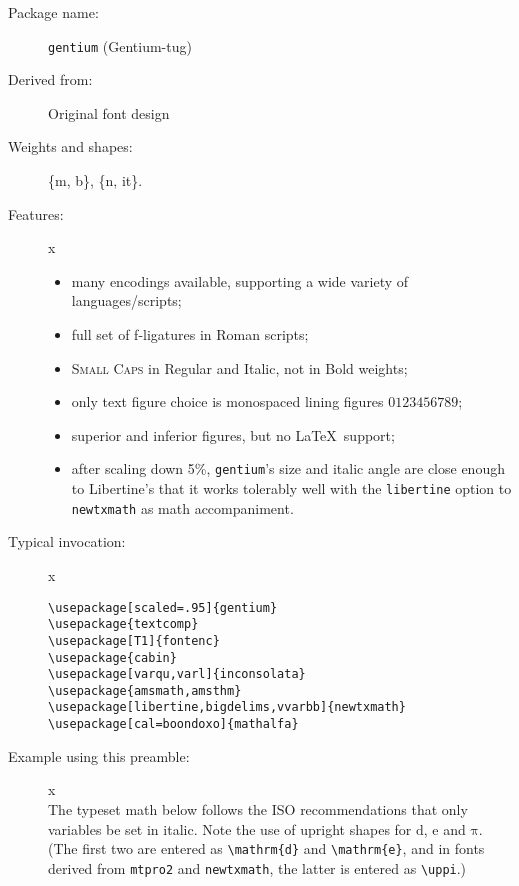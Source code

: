 \documentclass{article}
\def\Pr{\ensuremath{\mathbb{P}}}
\def\d{\mathrm{d}}
\begin{document}
\thispagestyle{empty}
\begin{description}
\item[Package name:] {\tt gentium} (Gentium-tug)
\item[Derived from:] Original font design
\item[Weights and shapes:]  \{m, b\}, \{n, it\}. 
\item[Features:]{\color{white}x}\\[-15pt]  
\begin{itemize}
\item many encodings available, supporting a wide variety of languages/scripts;
\item
full set of f-ligatures in Roman scripts;
\item \textsc{Small Caps} in Regular and Italic, not in Bold weights;
\item only text figure choice is monospaced lining figures $0123456789$;
\item superior and inferior figures, but no \LaTeX\ support; 
\item after scaling down 5\%, {\tt gentium}'s size and italic angle are close enough to Libertine's that it works tolerably well with the {\tt libertine} option to {\tt newtxmath} as math accompaniment.
\end{itemize}
\item[Typical invocation:]{\color{white}x}
\begin{verbatim}
\usepackage[scaled=.95]{gentium} 
\usepackage{textcomp}
\usepackage[T1]{fontenc}
\usepackage{cabin}
\usepackage[varqu,varl]{inconsolata}
\usepackage{amsmath,amsthm}
\usepackage[libertine,bigdelims,vvarbb]{newtxmath}
\usepackage[cal=boondoxo]{mathalfa}
\end{verbatim}
\item[Example using this preamble:]{\color{white}x}\\[6pt]
\lipsum[1]
\def\Pr{\ensuremath{\mathbb{P}}}
\def\d{\mathrm{d}}
The typeset math below follows the ISO recommendations that only variables
be set in italic. Note the use of upright shapes for $\d$, $\mathrm{e}$
and $\mathrm{\pi}$. (The first two are entered as \verb|\mathrm{d}| and
\verb|\mathrm{e}|, and in fonts derived from {\tt mtpro2} and  {\tt newtxmath},
 the latter is entered as \verb|\uppi|.)


\end{description}
\end{document}
